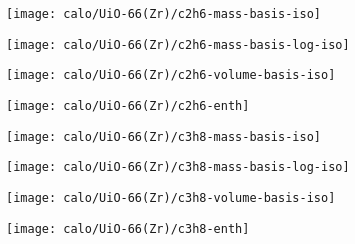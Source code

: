\begin{figure}[H]

    \begin{subfigure}{0.25\textwidth}
        \texttt{[image: calo/UiO-66(Zr)/c2h6-mass-basis-iso]}%
        \label{appx:fig:shaping:uio66c2h6mass}
    \end{subfigure}%
    \begin{subfigure}{0.25\textwidth}
        \texttt{[image: calo/UiO-66(Zr)/c2h6-mass-basis-log-iso]}%
        \label{appx:fig:shaping:uio66c2h6masslog}
    \end{subfigure}%
    \begin{subfigure}{0.25\textwidth}
        \texttt{[image: calo/UiO-66(Zr)/c2h6-volume-basis-iso]}%
        \label{appx:fig:shaping:uio66c2h6volume}
    \end{subfigure}%
    \begin{subfigure}{0.25\textwidth}
        \texttt{[image: calo/UiO-66(Zr)/c2h6-enth]}%
        \label{appx:fig:shaping:uio66c2h6enth}%
    \end{subfigure}%

    \begin{subfigure}{0.25\textwidth}
        \texttt{[image: calo/UiO-66(Zr)/c3h8-mass-basis-iso]}%
        \label{appx:fig:shaping:uio66c3h8mass}
    \end{subfigure}%
    \begin{subfigure}{0.25\textwidth}
        \texttt{[image: calo/UiO-66(Zr)/c3h8-mass-basis-log-iso]}%
        \label{appx:fig:shaping:uio66c3h8masslog}
    \end{subfigure}%
    \begin{subfigure}{0.25\textwidth}
        \texttt{[image: calo/UiO-66(Zr)/c3h8-volume-basis-iso]}%
        \label{appx:fig:shaping:uio66c3h8volume}
    \end{subfigure}%
    \begin{subfigure}{0.25\textwidth}
        \texttt{[image: calo/UiO-66(Zr)/c3h8-enth]}%
        \label{appx:fig:shaping:uio66c3h8enth}%
    \end{subfigure}%


\end{figure}
